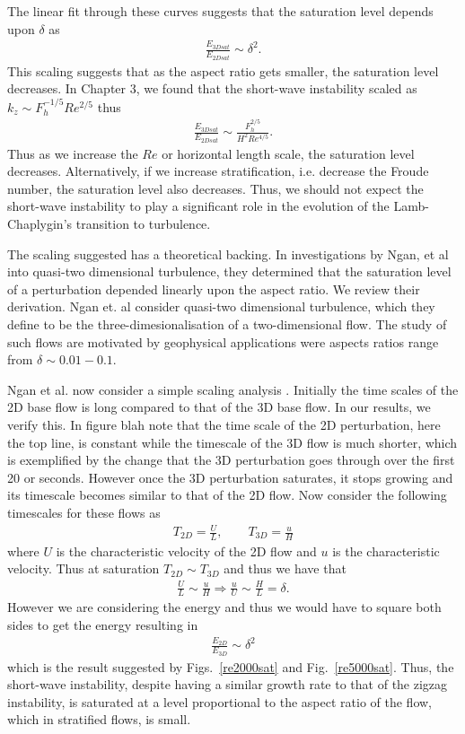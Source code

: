 The linear fit through these curves suggests that the saturation level depends upon $\delta$ as
\begin{align}
\frac{E_{3Dsat}}{E_{2Dsat}} \sim \delta^{2}.
\end{align}
This scaling suggests that as the aspect ratio gets smaller, the saturation level decreases. In Chapter 3, we found that the short-wave instability scaled as $k_{z}\sim F_{h}^{-1/5}Re^{2/5}$ thus
\begin{align}
\frac{E_{3Dsat}}{E_{2Dsat}} \sim \frac{F_{h}^{2/5}}{H^{2}Re^{4/5}}.
\end{align}
Thus as we increase the $Re$ or horizontal length scale, the saturation level decreases. Alternatively, if we increase stratification, i.e. decrease the Froude number, the saturation level also decreases. Thus, we should not expect the short-wave instability to play a significant role in the evolution of the Lamb-Chaplygin's transition to turbulence. 

The scaling suggested has a theoretical backing. In investigations by Ngan, et al \cite{ngan2005} into quasi-two dimensional turbulence, they determined that the saturation level of a perturbation depended linearly upon the aspect ratio. We review their derivation. Ngan et. al \cite{ngan2005} consider quasi-two dimensional turbulence, which they define to be the three-dimesionalisation of a two-dimensional flow. The study of such flows are motivated by geophysical applications were aspects ratios range from $\delta\sim 0.01-0.1$\cite{ngan2005}. 


Ngan et al. now consider a simple scaling analysis \cite{ngan2005}. Initially the time scales of the 2D base flow is long compared to that of the 3D base flow. In our results, we verify this. In figure blah note that the time scale of the 2D perturbation, here the top line, is constant while the timescale of the 3D flow is much shorter, which is exemplified by the change that the 3D perturbation goes through over the first 20 or seconds. However once the 3D perturbation saturates, it stops growing and its timescale becomes similar to that of the 2D flow.  Now consider the following timescales for these flows \cite{ngan2005} as
\begin{align}
T_{2D} = \frac{U}{L},\qquad T_{3D} =\frac{u}{H}
\end{align}
where $U$ is the characteristic velocity of the 2D flow and $u$ is the characteristic velocity. Thus at saturation $T_{2D}\sim T_{3D}$ and thus we have that
\begin{align}
\frac{U}{L}\sim\frac{u}{H} \Rightarrow \frac{u}{U} \sim \frac{H}{L} = \delta .
\end{align}
However we are considering the energy and thus we would have to square both sides to get the energy resulting in
\begin{align}
\frac{E_{2D}}{E_{3D}} \sim \delta^{2}
\end{align}
which is the result suggested by Figs.~\ref{re2000sat} and Fig.~\ref{re5000sat}. Thus, the short-wave instability, despite having a similar growth rate to that of the zigzag instability, is saturated at a level proportional to the aspect ratio of the flow, which in stratified flows, is small.  


